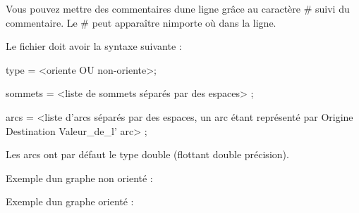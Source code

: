 Vous pouvez mettre des commentaires d\textquotesingle{}une ligne grâce au caractère \# suivi du commentaire. Le \# peut apparaître n\textquotesingle{}importe où dans la ligne.

Le fichier doit avoir la syntaxe suivante \+:


\begin{DoxyCode}
type = <oriente OU non-oriente>;

sommets = <liste de sommets séparés par des espaces> ;

arcs = <liste d\textcolor{stringliteral}{'arcs séparés par des espaces, un arc étant représenté par Origine Destination Valeur\_de\_l'}
      arc> ;
\end{DoxyCode}


Les arcs ont par défaut le type double (flottant double précision).

Exemple d\textquotesingle{}un graphe non orienté \+: 
\begin{DoxyCodeInclude}
\end{DoxyCodeInclude}


Exemple d\textquotesingle{}un graphe orienté \+: 
\begin{DoxyCodeInclude}
\end{DoxyCodeInclude}
 